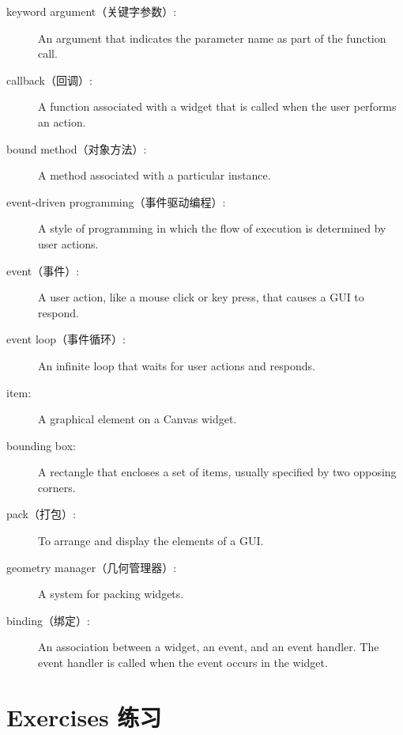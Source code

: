 \documentclass[10pt]{book}
\begin{document}
\begin{CJK}{UTF8}{gbsn}
\begin{description}
\item[keyword argument（关键字参数）:] An argument that indicates the parameter
name as part of the function call.

\item[callback（回调）:] A function associated with a widget that is
called when the user performs an action.

\item[bound method（对象方法）:] A method associated with a particular instance.

\item[event-driven programming（事件驱动编程）:] A style of programming in which
the flow of execution is determined by user actions.

\item[event（事件）:] A user action, like a mouse click or key press, that
causes a GUI to respond.

\item[event loop（事件循环）:] An infinite loop that waits for user actions
and responds.

\item[item:] A graphical element on a Canvas widget.

\item[bounding box:] A rectangle that encloses a set of items,
usually specified by two opposing corners.

\item[pack（打包）:] To arrange and display the elements of a GUI.

\item[geometry manager（几何管理器）:] A system for packing widgets.

\item[binding（绑定）:] An association between a widget, an event, and
an event handler.  The event handler is called when the event
occurs in the widget.

\end{description}


\section{Exercises 练习}

\begin{exercise}


\end{exercise}
\end{CJK}
\end{document}
